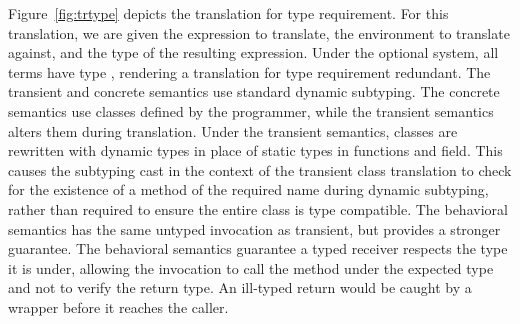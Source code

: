 \documentclass[runnningheads]{tex/llncs}
\begin{document}
Figure~\ref{fig:trtype} depicts the translation for type requirement. For
this translation, we are given the expression to translate, the environment
to translate against, and the \kafka type of the resulting
expression. Under the optional system, all terms have type \any, rendering a
translation for type requirement redundant.
The transient and concrete semantics use standard dynamic subtyping.
The concrete semantics use classes defined by the programmer, while the
transient semantics alters them during translation. Under the transient
semantics, classes are rewritten with dynamic types in place of static types
in functions and field. This causes the subtyping cast in the context of the
transient class translation to check for the existence of a method of
the required name during dynamic subtyping, rather than required to ensure 
the entire class is type compatible.
The behavioral semantics has the same untyped invocation as transient, but 
provides a stronger guarantee. 
The behavioral semantics guarantee a typed receiver respects the type
it is under, allowing the invocation to call the method under the
expected type and not to verify the return type. An ill-typed return
would be caught by a wrapper before it reaches the caller.
\end{document}
